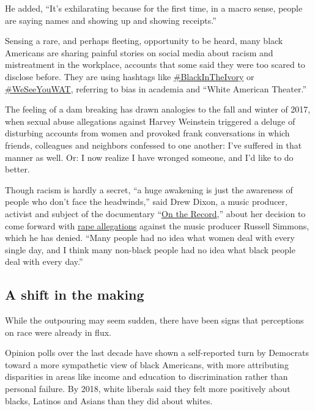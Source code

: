 He added, ``It's exhilarating because for the first time, in a macro
sense, people are saying names and showing up and showing receipts.''

Sensing a rare, and perhaps fleeting, opportunity to be heard, many
black Americans are sharing painful stories on social media about racism
and mistreatment in the workplace, accounts that some said they were too
scared to disclose before. They are using hashtags like
\href{https://twitter.com/search?q=\%23BlackintheIvory\&src=typeahead_click}{\#BlackInTheIvory}
or
\href{https://twitter.com/search?q=\%23WeSeeYouwat\&src=typeahead_click}{\#WeSeeYouWAT},
referring to bias in academia and ``White American Theater.''

The feeling of a dam breaking has drawn analogies to the fall and winter
of 2017, when sexual abuse allegations against Harvey Weinstein
triggered a deluge of disturbing accounts from women and provoked frank
conversations in which friends, colleagues and neighbors confessed to
one another: I've suffered in that manner as well. Or: I now realize I
have wronged someone, and I'd like to do better.

Though racism is hardly a secret, ``a huge awakening is just the
awareness of people who don't face the headwinds,'' said Drew Dixon, a
music producer, activist and subject of the documentary
``\href{https://www.nytimes3xbfgragh.onion/2020/05/27/movies/on-the-record-russell-simmons-review.html}{On
the Record},'' about her decision to come forward with
\href{https://www.nytimes3xbfgragh.onion/2017/12/13/arts/music/russell-simmons-rape.html}{rape
allegations} against the music producer Russell Simmons, which he has
denied. ``Many people had no idea what women deal with every single day,
and I think many non-black people had no idea what black people deal
with every day.''

\hypertarget{a-shift-in-the-making}{%
\subsection{A shift in the making}\label{a-shift-in-the-making}}

While the outpouring may seem sudden, there have been signs that
perceptions on race were already in flux.

Opinion polls over the last decade have shown a self-reported turn by
Democrats toward a more sympathetic view of black Americans, with more
attributing disparities in areas like income and education to
discrimination rather than personal failure. By 2018, white liberals
said they felt more positively about blacks, Latinos and Asians than
they did about whites.


